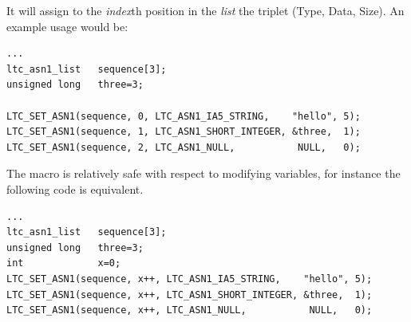 \documentclass[synpaper]{book}
\begin{document}
It will assign to the \textit{index}th position in the \textit{list} the triplet (Type, Data, Size).  An example usage would be:

\begin{small}
\begin{verbatim}
...
ltc_asn1_list   sequence[3];
unsigned long   three=3;

LTC_SET_ASN1(sequence, 0, LTC_ASN1_IA5_STRING,    "hello", 5);
LTC_SET_ASN1(sequence, 1, LTC_ASN1_SHORT_INTEGER, &three,  1);
LTC_SET_ASN1(sequence, 2, LTC_ASN1_NULL,           NULL,   0);
\end{verbatim}
\end{small}

The macro is relatively safe with respect to modifying variables, for instance the following code is equivalent.

\begin{small}
\begin{verbatim}
...
ltc_asn1_list   sequence[3];
unsigned long   three=3;
int             x=0;
LTC_SET_ASN1(sequence, x++, LTC_ASN1_IA5_STRING,    "hello", 5);
LTC_SET_ASN1(sequence, x++, LTC_ASN1_SHORT_INTEGER, &three,  1);
LTC_SET_ASN1(sequence, x++, LTC_ASN1_NULL,           NULL,   0);
\end{verbatim}
\end{small}
\end{document}
